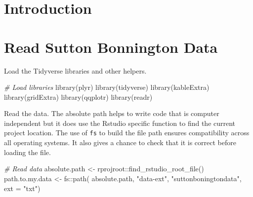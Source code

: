 \documentclass{article}
\title{\myTitleMainTitle}
\author{
    Dr Paul J. Palmer
   \\
    Wolfson School of Mechanical, Electrical and Manufacturing Engineering \\
    Loughborough University \\
  Leicestershire VC55 \\
  \texttt{\href{mailto:p.j.palmer@lboro.ac.uk}{\nolinkurl{p.j.palmer@lboro.ac.uk}}} \\
  }
\newenvironment{Shaded}{\begin{snugshade}}{\end{snugshade}}
\newcommand{\AttributeTok}[1]{\textcolor[rgb]{0.77,0.63,0.00}{#1}}
\newcommand{\CommentTok}[1]{\textcolor[rgb]{0.56,0.35,0.01}{\textit{#1}}}
\newcommand{\FunctionTok}[1]{\textcolor[rgb]{0.00,0.00,0.00}{#1}}
\newcommand{\NormalTok}[1]{#1}
\newcommand{\OtherTok}[1]{\textcolor[rgb]{0.56,0.35,0.01}{#1}}
\newcommand{\SpecialCharTok}[1]{\textcolor[rgb]{0.00,0.00,0.00}{#1}}
\newcommand{\StringTok}[1]{\textcolor[rgb]{0.31,0.60,0.02}{#1}}
\begin{document}
\maketitle

\def\tightlist{}


\begin{abstract}
\myAbstract
\end{abstract}


\hypertarget{introduction}{%
\section{Introduction}\label{introduction}}

\myTitleMainTitle

\hypertarget{read-sutton-bonnington-data}{%
\section{Read Sutton Bonnington Data}\label{read-sutton-bonnington-data}}

Load the Tidyverse libraries and other helpers.

\begin{Shaded}
\begin{Highlighting}[]
\CommentTok{\# Load libraries}
\FunctionTok{library}\NormalTok{(plyr)}
\FunctionTok{library}\NormalTok{(tidyverse)}
\FunctionTok{library}\NormalTok{(kableExtra)}
\FunctionTok{library}\NormalTok{(gridExtra)}
\FunctionTok{library}\NormalTok{(qqplotr)}
\FunctionTok{library}\NormalTok{(readr)}
\end{Highlighting}
\end{Shaded}

Read the data. The absolute path helps to write code that is computer independent but it does use the Rstudio specific function to find the current project location. The use of \texttt{fs} to build the file path ensures compatibility across all operating systems. It also gives a chance to check that it is correct before loading the file.

\begin{Shaded}
\begin{Highlighting}[]
\CommentTok{\# Read data}
\NormalTok{absolute.path }\OtherTok{\textless{}{-}}\NormalTok{ rprojroot}\SpecialCharTok{::}\FunctionTok{find\_rstudio\_root\_file}\NormalTok{()}
\NormalTok{path.to.my.data }\OtherTok{\textless{}{-}}\NormalTok{ fs}\SpecialCharTok{::}\FunctionTok{path}\NormalTok{( absolute.path,}
                             \StringTok{"data{-}ext"}\NormalTok{,}
                             \StringTok{"suttonboningtondata"}\NormalTok{, }
                            \AttributeTok{ext =} \StringTok{"txt"}\NormalTok{)}
\end{Highlighting}
\end{Shaded}
\end{document}
